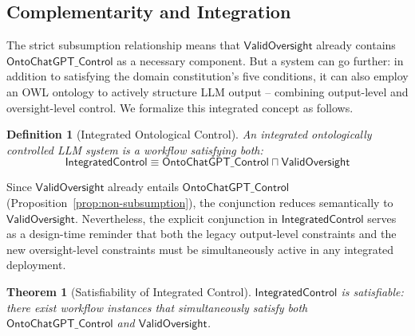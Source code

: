 \documentclass[11pt]{article}
\newtheorem{definition}{Definition}[section]
\newtheorem{theorem}{Theorem}[section]
\begin{document}
\subsection{Complementarity and Integration}
\label{sec:complementarity}

The strict subsumption relationship means that $\mathsf{ValidOversight}$ already contains $\mathsf{OntoChatGPT\_Control}$ as a necessary component.
But a system can go further: in addition to satisfying the domain constitution's five conditions, it can also employ an OWL ontology to actively structure LLM output -- combining output-level and oversight-level control.
We formalize this integrated concept as follows.

\begin{definition}[Integrated Ontological Control]
\label{def:integrated}
An \emph{integrated ontologically controlled LLM system} is a workflow satisfying both:
\begin{equation}
  \mathsf{IntegratedControl} \equiv \mathsf{OntoChatGPT\_Control} \sqcap \mathsf{ValidOversight}
\end{equation}
\end{definition}

Since $\mathsf{ValidOversight}$ already entails $\mathsf{OntoChatGPT\_Control}$ (Proposition~\ref{prop:non-subsumption}), the conjunction reduces semantically to $\mathsf{ValidOversight}$.
Nevertheless, the explicit conjunction in $\mathsf{IntegratedControl}$ serves as a design-time reminder that both the legacy output-level constraints and the new oversight-level constraints must be simultaneously active in any integrated deployment.

\begin{theorem}[Satisfiability of Integrated Control]
\label{thm:integrated}
$\mathsf{IntegratedControl}$ is satisfiable: there exist workflow instances that simultaneously satisfy both $\mathsf{OntoChatGPT\_Control}$ and $\mathsf{ValidOversight}$.
\end{theorem}
\end{document}
